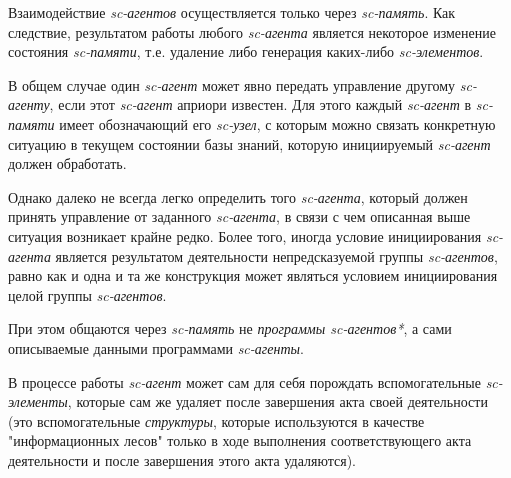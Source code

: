 \begin{SCn}
{Взаимодействие \textit{sc-агентов} осуществляется только через \textit{sc-память}. Как следствие, результатом работы любого \textit{sc-агента} является некоторое изменение состояния \textit{sc-памяти}, т.е. удаление либо генерация каких-либо \textit{sc-элементов}.

В общем случае один \textit{sc-агент} может явно передать управление другому \textit{sc-агенту}, если этот \textit{sc-агент} априори известен. Для этого каждый \textit{sc-агент} в \textit{sc-памяти} имеет обозначающий его \textit{sc-узел}, с которым можно связать конкретную ситуацию в текущем состоянии базы знаний, которую инициируемый \textit{sc-агент} должен обработать.

Однако далеко не всегда легко определить того \textit{sc-агента}, который должен принять управление от заданного \textit{sc-агента}, в связи с чем описанная выше ситуация возникает крайне редко. Более того, иногда условие инициирования \textit{sc-агента} является результатом деятельности непредсказуемой группы \textit{sc-агентов}, равно как и одна и та же конструкция может являться условием инициирования целой группы \textit{sc-агентов}.

При этом общаются через \textit{sc-память} не \textit{программы sc-агентов*}, а сами описываемые данными программами \textit{sc-агенты}.

В процессе работы \textit{sc-агент} может сам для себя порождать вспомогательные \textit{sc-элементы}, которые сам же удаляет после завершения акта своей деятельности (это вспомогательные \textit{структуры}, которые используются в качестве "информационных лесов"{} только в ходе выполнения соответствующего акта деятельности и после завершения этого акта удаляются).}




\end{SCn}
